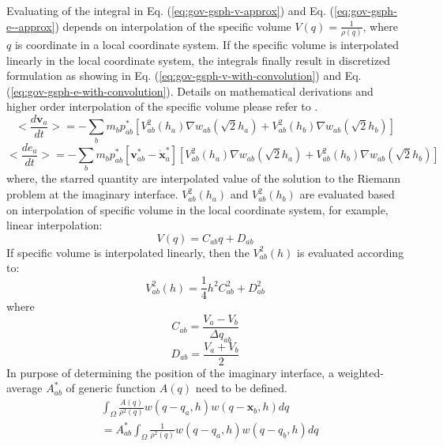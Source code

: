 Evaluating of the integral in Eq. (\ref{eq:gov-gsph-v-approx}) and Eq. (\ref{eq:gov-gsph-e--approx}) depends on interpolation of the specific volume $V(q) = \frac{1}{\rho(q)}$, where $q$ is coordinate in a local coordinate system. If the specific volume is interpolated linearly in the local coordinate system, the integrals finally result in discretized formulation as showing in Eq. (\ref{eq:gov-gsph-v-with-convolution}) and Eq. (\ref{eq:gov-gsph-e-with-convolution}).
Details on mathematical derivations and higher order interpolation of the specific volume please refer to \citep{inutsuka2002reformulation}.
\begin{equation}
<\dfrac{d \textbf{v}_{a}}{dt}>= -\sum_{b} m_{b} p_{a b}^{\ast} \left[ V_{ab}^2(h_a) \nabla w_{a b}(\sqrt{2} h_{a}) + V_{ab}^2(h_b) \nabla w_{a b}(\sqrt{2} h_{b}) \right]
\label{eq:gov-gsph-v-with-convolution}
\end{equation}
\begin{equation}
<\dfrac{d e_{a}}{dt}>= - \sum_{b} m_{b} p_{a b}^{\ast} [\textbf{v}_{a b}^{\ast} - \dot{\textbf{x}}_{a}^{\ast}] \left[V_{ab}^2(h_a) \nabla w_{a b}(\sqrt{2} h_{a}) + V_{ab}^2(h_b) \nabla w_{a b}(\sqrt{2} h_{b}) \right]
\label{eq:gov-gsph-e-with-convolution}
\end{equation}
where, the starred quantity are interpolated value of the solution to the Riemann problem at the imaginary interface.
$V_{ab}^2(h_a)$ and $V_{ab}^2(h_b)$ are evaluated based on interpolation of specific volume in the local coordinate system, for example, linear interpolation: 
\begin{equation}
V(q) = C_{ab}q+D_{ab}
\label{eq:gsph-V-linear-interplation}
\end{equation}
If specific volume is interpolated linearly, then the $V^2_{ab}(h)$ is evaluated according to:
\begin{equation}
V^2_{ab}(h) = \frac{1}{4}h^2C_{ab}^2+D_{ab}^2
\label{eq:gsph-V-linear-interplation-sq}
\end{equation}
where
\begin{equation}
C_{ab} = \frac{V_a-V_b}{\Delta q_{ab}}
\label{eq:gsph-V-linear-interplation-C}
\end{equation}
\begin{equation}
D_{ab} = \frac{V_a+V_b}{2}
\label{eq:gsph-V-linear-interplation-D}
\end{equation}
In purpose of determining the position of the imaginary interface, a weighted-average $A_{ab}^{\ast}$ of generic function $A(q)$ need to be defined.
\begin{equation}
\begin{split}
& \int_{\Omega} \frac{A\left(q \right)}{\rho^2(q)} w\left(q -q_a, h\right) w(q - \textbf{x}_{b}, h) dq \\
& =A_{ab}^{\ast} \int_{\Omega} \frac{1}{\rho^2(q)} w\left(q -q_a, h\right) w(q - q_{b}, h) dq
\end{split}
\label{eq:GSPH-f-interpolation-def}
\end{equation}
